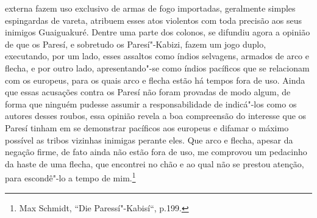 externa fazem uso exclusivo de armas de fogo importadas, geralmente
simples espingardas de vareta, atribuem esses atos violentos com toda
precisão aos seus inimigos Guaiguakuré. Dentre uma parte dos colonos,
se difundiu agora a opinião de que os Paresí, e sobretudo os
Paresí"-Kabizi, fazem um jogo duplo, executando, por um lado, esses
assaltos como índios selvagens, armados de arco e flecha, e por outro
lado, apresentando"-se como índios pacíficos que se relacionam com os
europeus, para os quais arco e flecha estão há tempos fora de uso. Ainda
que essas acusações contra os Paresí não foram provadas de modo algum,
de forma que ninguém pudesse assumir a responsabilidade de indicá"-los
como os autores desses roubos, essa opinião revela a boa compreensão do
interesse que os Paresí tinham em se demonstrar pacíficos aos europeus
e difamar o máximo possível as tribos vizinhas inimigas perante eles.
Que arco e flecha, apesar da negação firme, de fato ainda não estão fora
de uso, me comprovou um pedacinho da haste de uma flecha, que encontrei
no chão e ao qual não se prestou atenção, para escondê"-lo a tempo de
mim.\footnote{Max Schmidt, ``Die Paressí"-Kabisí``, p.199.}


